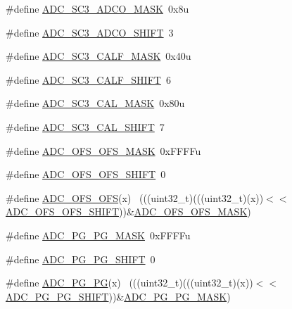 \begin{DoxyCompactItemize}
\item 
\#define \hyperlink{group___a_d_c___register___masks_ga9054cd805b818a928ca4309c717466db}{A\+D\+C\+\_\+\+S\+C3\+\_\+\+A\+D\+C\+O\+\_\+\+M\+A\+SK}~0x8u
\item 
\#define \hyperlink{group___a_d_c___register___masks_ga8e5f5e3a1378880d2a03d1662f39c308}{A\+D\+C\+\_\+\+S\+C3\+\_\+\+A\+D\+C\+O\+\_\+\+S\+H\+I\+FT}~3
\item 
\#define \hyperlink{group___a_d_c___register___masks_ga3a706436447b6113727826e303c3fbe6}{A\+D\+C\+\_\+\+S\+C3\+\_\+\+C\+A\+L\+F\+\_\+\+M\+A\+SK}~0x40u
\item 
\#define \hyperlink{group___a_d_c___register___masks_ga9fd60a35fc4c15b563078ecbd3eaa449}{A\+D\+C\+\_\+\+S\+C3\+\_\+\+C\+A\+L\+F\+\_\+\+S\+H\+I\+FT}~6
\item 
\#define \hyperlink{group___a_d_c___register___masks_ga0ec589c9101684eeac4af85452ed3673}{A\+D\+C\+\_\+\+S\+C3\+\_\+\+C\+A\+L\+\_\+\+M\+A\+SK}~0x80u
\item 
\#define \hyperlink{group___a_d_c___register___masks_ga808101f85e6ceff194c212faacf4bd9d}{A\+D\+C\+\_\+\+S\+C3\+\_\+\+C\+A\+L\+\_\+\+S\+H\+I\+FT}~7
\item 
\#define \hyperlink{group___a_d_c___register___masks_ga1532ae43eb63d6c071f531cca89fdb68}{A\+D\+C\+\_\+\+O\+F\+S\+\_\+\+O\+F\+S\+\_\+\+M\+A\+SK}~0x\+F\+F\+F\+Fu
\item 
\#define \hyperlink{group___a_d_c___register___masks_ga86de5d25a5433db6e96700e2d000ad07}{A\+D\+C\+\_\+\+O\+F\+S\+\_\+\+O\+F\+S\+\_\+\+S\+H\+I\+FT}~0
\item 
\#define \hyperlink{group___a_d_c___register___masks_ga05a86dc2179bf28986dac6c3b8f2ad86}{A\+D\+C\+\_\+\+O\+F\+S\+\_\+\+O\+FS}(x)                                                  ~(((uint32\+\_\+t)(((uint32\+\_\+t)(x))$<$$<$\hyperlink{group___a_d_c___register___masks_ga86de5d25a5433db6e96700e2d000ad07}{A\+D\+C\+\_\+\+O\+F\+S\+\_\+\+O\+F\+S\+\_\+\+S\+H\+I\+FT}))\&\hyperlink{group___a_d_c___register___masks_ga1532ae43eb63d6c071f531cca89fdb68}{A\+D\+C\+\_\+\+O\+F\+S\+\_\+\+O\+F\+S\+\_\+\+M\+A\+SK})
\item 
\#define \hyperlink{group___a_d_c___register___masks_ga0619279d8dcf43af1fda9f27090ae51b}{A\+D\+C\+\_\+\+P\+G\+\_\+\+P\+G\+\_\+\+M\+A\+SK}~0x\+F\+F\+F\+Fu
\item 
\#define \hyperlink{group___a_d_c___register___masks_ga014623fb35c473d12ff7fc64c3e8cfe3}{A\+D\+C\+\_\+\+P\+G\+\_\+\+P\+G\+\_\+\+S\+H\+I\+FT}~0
\item 
\#define \hyperlink{group___a_d_c___register___masks_gaee91977cfc6901ece0f38f9129a6bb8d}{A\+D\+C\+\_\+\+P\+G\+\_\+\+PG}(x)                                                      ~(((uint32\+\_\+t)(((uint32\+\_\+t)(x))$<$$<$\hyperlink{group___a_d_c___register___masks_ga014623fb35c473d12ff7fc64c3e8cfe3}{A\+D\+C\+\_\+\+P\+G\+\_\+\+P\+G\+\_\+\+S\+H\+I\+FT}))\&\hyperlink{group___a_d_c___register___masks_ga0619279d8dcf43af1fda9f27090ae51b}{A\+D\+C\+\_\+\+P\+G\+\_\+\+P\+G\+\_\+\+M\+A\+SK})

\end{DoxyCompactItemize}
